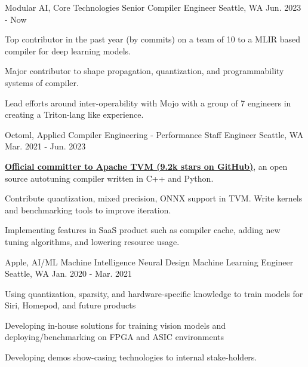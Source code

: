 \begin{cventries}
    \vspace{-0.6em}
  \cventry
    {Modular AI, Core Technologies}
    {Senior Compiler Engineer}
    {Seattle, WA}
    {Jun. 2023 - Now}
    {
      \begin{cvitems}
        \item {Top contributor in the past year (by commits) on a team of 10 to a MLIR based compiler for deep learning models.}
		\item {Major contributor to shape propagation, quantization, and programmability systems of compiler.}
		\item {Lead efforts around inter-operability with Mojo with a group of 7 engineers in creating a Triton-lang like experience.}
	\vspace{-1em}
      \end{cvitems}
    }

  \vspace{-0.4em}
  \cventry
    {Octoml, Applied Compiler Engineering - Performance}
    {Staff Engineer}
    {Seattle, WA}
    {Mar. 2021 - Jun. 2023}
    {
      \begin{cvitems}
        \item {\underline{\textbf{Official committer to Apache TVM (9.2k stars on GitHub)}}, an open source autotuning compiler written in C++ and Python.}
		\item {Contribute quantization, mixed precision, ONNX support in TVM. Write kernels and benchmarking tools to improve iteration.}
		\item {Implementing features in SaaS product such as compiler cache, adding new tuning algorithms, and lowering resource usage.}
	\vspace{-1em}
      \end{cvitems}
    }


  \cventry
    {Apple, AI/ML Machine Intelligence Neural Design}
    {Machine Learning Engineer}
    {Seattle, WA}
    {Jan. 2020 - Mar. 2021}
    {
      \begin{cvitems}
        \item {Using quantization, sparsity, and hardware-specific knowledge to train models for Siri, Homepod, and future products}
        \item {Developing in-house solutions for training vision models and deploying/benchmarking on FPGA and ASIC environments}
		\item {Developing demos show-casing technologies to internal stake-holders.}
	\vspace{-1em}
      \end{cvitems}
    }


\end{cventries}
